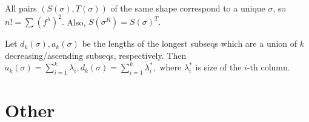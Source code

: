 \begin{comment}
For $\sigma=(5,2,3,1,4),$
$$S(\sigma): \begin{array}{c}
5
\end{array}\to \begin{array}{c}
2 \\ 
5
\end{array}\to \begin{array}{cc}
2 & 3 \\ 
5
\end{array}\to \begin{array}{cc}
1 & 3 \\ 
2 \\
5
\end{array}\to \begin{array}{ccc}
1 & 3 & 4\\ 
2 \\
5
\end{array}$$
$$T(\sigma): \begin{array}{c}
1
\end{array}\to \begin{array}{c}
1 \\ 
2
\end{array}\to \begin{array}{cc}
1 & 3 \\ 
2
\end{array}\to \begin{array}{cc}
1 & 3 \\ 
2 \\
4
\end{array}\to \begin{array}{ccc}
1 & 3 & 5\\ 
2 \\
4
\end{array}$$
\end{comment}

All pairs $(S(\sigma),T(\sigma))$ of the same shape correspond to a unique $\sigma$, so
$n!=\sum (f^{\lambda})^2.$ Also, $S(\sigma^R)=S(\sigma)^T.$

Let $d_k(\sigma),a_k(\sigma)$ be the lengths of the longest subseqs which are a union of $k$ decreasing/ascending subseqs, respectively. Then $a_k(\sigma)=\sum_{i=1}^k\lambda_i, d_k(\sigma)=\sum_{i=1}^k\lambda^*_i,$ where $\lambda^*_i$ is size of the $i$-th column. 



\section{Other}
